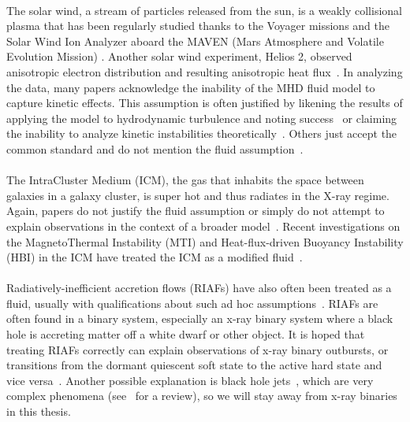 \\
The solar wind, a stream of particles released from the sun, is a weakly collisional plasma that has been regularly studied thanks to the Voyager missions and the Solar Wind Ion Analyzer aboard the MAVEN (Mars Atmosphere and Volatile Evolution Mission) \cite{NASA2017}. Another solar wind experiment, Helios 2, observed anisotropic electron distribution and resulting anisotropic heat flux~\cite{Pilipp1987}. In analyzing the data, many papers acknowledge the inability of the MHD fluid model to capture kinetic effects. This assumption is often justified by likening the results of applying the model to hydrodynamic turbulence and noting success~\cite{Matthaeus1982,Goldstein1995} or claiming the inability to analyze kinetic instabilities theoretically~\cite{Schwartz1980,Pudovkin1985}. Others just accept the common standard and do not mention the fluid assumption~\cite{Gosling1996}. \\
\\
The IntraCluster Medium (ICM), the gas that inhabits the space between galaxies in a galaxy cluster, is super hot and thus radiates in the X-ray regime. Again, papers do not justify the fluid assumption or simply do not attempt to explain observations in the context of a broader model~\cite{Fabian1994,Carilli2002,Mendygral2012}. Recent investigations on the MagnetoThermal Instability (MTI) and Heat-flux-driven Buoyancy Instability (HBI) in the ICM have treated the ICM as a modified fluid~\cite{Chandran2006,Parrish2008a,Parrish2008b,Parrish2007,Parrish2005}.\\
\\
Radiatively-inefficient accretion flows (RIAFs) have also often been treated as a fluid, usually with qualifications about such ad hoc assumptions~\cite{Dexter2013,Hawley2001,Stone1996,Jiang2013,Jiang2014,Stone1994,Turner2002,Sano2004}. RIAFs are often found in a binary system, especially an x-ray binary system where a black hole is accreting matter off a white dwarf or other object. It is hoped that treating RIAFs correctly can explain observations of x-ray binary outbursts, or transitions from the dormant quiescent soft state to the active hard state and vice versa~\cite{McClintock2006,Das2013,Das2013b,Niedzwiecki2014,Sadowski2016}. Another possible explanation is black hole jets~\cite{Veledina2013,Fender2009,Nixon2014}, which are very complex phenomena (see~\cite{Hawley2015} for a review), so we will stay away from x-ray binaries in this thesis.\\
\\
